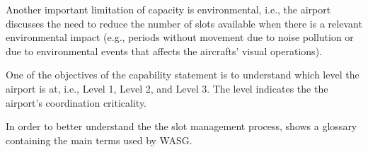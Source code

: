 Another important limitation of capacity is environmental, i.e., the airport discusses the need to reduce the number of slots available when there is a relevant environmental impact (e.g., periods without movement due to noise pollution or due to environmental events that affects the aircrafts’ visual operations). 

One of the objectives of the capability statement is to understand which level the airport is at, i.e., Level 1, Level 2, and Level 3. The level indicates the the airport's coordination criticality. 

In order to better understand the the slot management process,  shows a glossary containing the main terms used by WASG.



